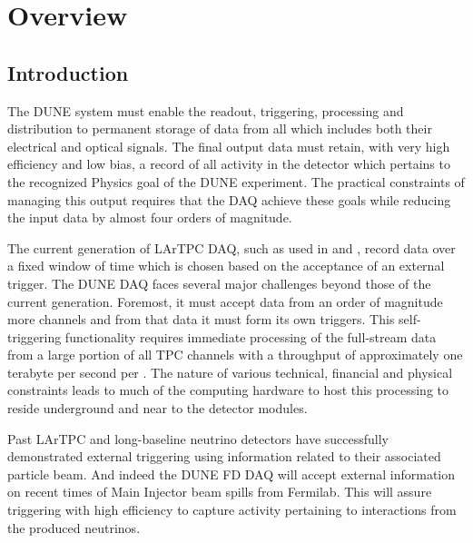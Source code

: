 \section{Overview}
\label{sec:fd-daq-ov}


\subsection{Introduction}
\label{sec:fd-daq-intro}

The DUNE   system must enable the readout,
triggering, processing and distribution to permanent storage of data
from all  which includes both their electrical
 and optical  signals.  
The final output data must retain, with very high efficiency and low
bias, a record of all activity in the detector which pertains to the
recognized Physics goal of the DUNE experiment. 
The practical constraints of managing this output requires that the
DAQ achieve these goals while reducing the input data by almost four
orders of magnitude.

The current generation of LArTPC DAQ, such as used in
 and \microboone, record data over a fixed window of
time which is chosen based on the acceptance of an external trigger. 
The DUNE DAQ faces several major challenges beyond those of the
current generation. 
Foremost, it must accept data from an order of magnitude more channels
and from that data it must form its own triggers.
This self-triggering functionality requires immediate processing of
the full-stream data from a large portion of all TPC channels with a
throughput of approximately one terabyte per second per
. 
The nature of various technical, financial and physical constraints
leads to much of the computing hardware to host this processing to
reside underground and near to the detector modules.

Past LArTPC and long-baseline neutrino detectors have successfully
demonstrated external triggering using information related to their
associated particle beam. 
And indeed the DUNE FD DAQ will accept external information on recent
times of Main Injector beam spills from Fermilab. 
This will assure triggering with high efficiency to capture activity
pertaining to interactions from the produced neutrinos. 

